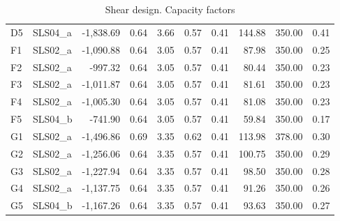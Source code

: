 \begin{table}
\begin{center}
\begin{scriptsize}
\begin{tabular}{|l|l|r|r|r|r|r|r|r|r|}
 D5 &  SLS04\_a & -1,838.69 & 0.64 & 3.66 & 0.57 & 0.41 & 144.88 & 350.00 & 0.41\\
 F1 &  SLS02\_a & -1,090.88 & 0.64 & 3.05 & 0.57 & 0.41 & 87.98 & 350.00 & 0.25\\
 F2 &  SLS02\_a & -997.32 & 0.64 & 3.05 & 0.57 & 0.41 & 80.44 & 350.00 & 0.23\\
 F3 &  SLS02\_a & -1,011.87 & 0.64 & 3.05 & 0.57 & 0.41 & 81.61 & 350.00 & 0.23\\
 F4 &  SLS02\_a & -1,005.30 & 0.64 & 3.05 & 0.57 & 0.41 & 81.08 & 350.00 & 0.23\\
 F5 &  SLS04\_b & -741.90 & 0.64 & 3.05 & 0.57 & 0.41 & 59.84 & 350.00 & 0.17\\
 G1 &  SLS02\_a & -1,496.86 & 0.69 & 3.35 & 0.62 & 0.41 & 113.98 & 378.00 & 0.30\\
 G2 &  SLS02\_a & -1,256.06 & 0.64 & 3.35 & 0.57 & 0.41 & 100.75 & 350.00 & 0.29\\
 G3 &  SLS02\_a & -1,227.94 & 0.64 & 3.35 & 0.57 & 0.41 & 98.50 & 350.00 & 0.28\\
 G4 &  SLS02\_a & -1,137.75 & 0.64 & 3.35 & 0.57 & 0.41 & 91.26 & 350.00 & 0.26\\
 G5 &  SLS04\_b & -1,167.26 & 0.64 & 3.35 & 0.57 & 0.41 & 93.63 & 350.00 & 0.27\\
\hline
  \end{tabular}
  \end{scriptsize}
\end{center}
\caption{Shear design. Capacity factors}\label{tb_footings_shear_design}
\end{table}


